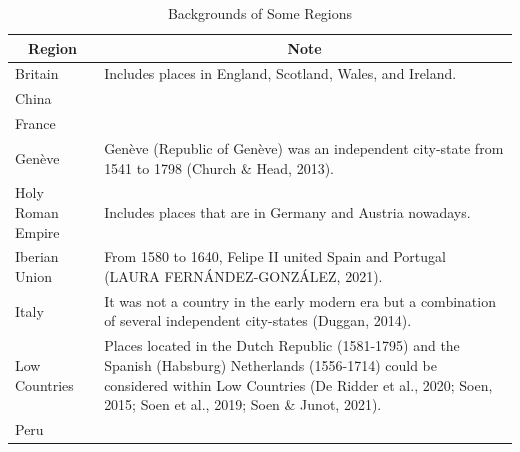 \documentclass[12pt,a4paper,oneside]{book}
\begin{document}
\begin{sloppypar}
\begin{table}[H]
\centering
\caption{Backgrounds of Some Regions}
\label{tab:infoRegion}
\begin{tabularx}{\textwidth}{l|X}
\multicolumn{1}{c|}{\textbf{Region}} & \multicolumn{1}{c}{\textbf{Note}}                                                                                                                                                                                          \\ \hline
Britain                              & Includes places in England, Scotland, Wales, and Ireland.                                                                                                                                                                  \\
China                                &                                                                                                                                                                                                                            \\
France                               &                                                                                                                                                                                                                            \\
Genève                               & Genève (Republic of Genève) was an independent city-state from 1541 to 1798 (Church \& Head, 2013).                                                                                                                        \\
Holy Roman Empire                    & Includes places that are in Germany and Austria nowadays.                                                                                                                                                                  \\
Iberian Union                        & From 1580 to 1640, Felipe II united Spain and Portugal (LAURA FERNÁNDEZ-GONZÁLEZ, 2021).                                                                                                                                   \\
Italy                                & It was not a country in the early modern era but a combination of several independent city-states (Duggan, 2014).                                                                                                          \\
Low Countries                        & Places located in the Dutch Republic (1581-1795) and the Spanish (Habsburg) Netherlands (1556-1714) could be considered within Low Countries (De Ridder et al., 2020; Soen, 2015; Soen et al., 2019; Soen \& Junot, 2021). \\
Peru                                 &                                                                                                                                                                                                                           
\end{tabularx}
\end{table}


\end{sloppypar}
\end{document}

